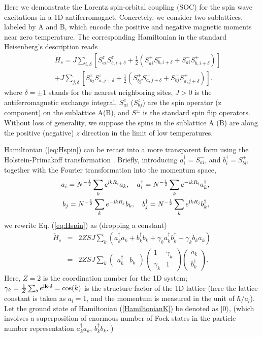\documentclass[pra,epsfig,rotate,superscriptaddress,showpacs]{revtex4}
\begin{document}
Here we demonstrate the Lorentz spin-orbital coupling (SOC) for the spin wave excitations in a 1D antiferromagnet. Concretely, we consider two sublattices, labeled by A and B, which encode the positive and negative magnetic moments near zero temperature. The corresponding Hamiltonian in the standard Heisenberg's description reads
\begin{eqnarray} \nonumber
&&H_s =J\sum_{i,\delta}[S_{ai}^zS_{b,i+\delta}^z+\frac{1}{2}(S_{ai}^+S_{b,i+\delta}^-+S_{ai}^-S_{b,i+\delta}^+)] \\
&&+J\sum_{j,\delta}[S_{bj}^zS_{a,j+\delta}^z+\frac{1}{2}(S_{bj}^+S_{a,j+\delta}^-+S_{bj}^-S_{a,j+\delta}^+)].\label{eq:Hspin}
\end{eqnarray}
where $\delta=\pm 1$ stands for the nearest neighboring sites, $J>0$ is the antiferromagnetic exchange integral, $S^z_{ai}$ ($S^z_{bj}$) are the spin operator (z component) on the sublattice A(B), and $S^\pm$ is the standard spin flip operators. Without loss of generality, we suppose the spins in the sublattice A (B) are along the positive (negative) $z$ direction in the limit of low temperatures.

Hamiltonian (\ref{eq:Hspin}) can be recast into a more transparent form using the Holstein-Primakoff transformation \cite{Holstein}. Briefly, introducing $a_i^\dag=S_{ai}^-$, and $b_i^\dag=S_{bi}^+$, together with the Fourier transformation into the momentum space,
\begin{eqnarray}
&&a_i=N^{-\frac{1}{2}}\sum_k e^{{\text i}kR_i}a_k, \quad a_i^\dag=N^{-\frac{1}{2}}\sum_k e^{-{\text i}kR_i}a_k^\dag, \\
&&b_j=N^{-\frac{1}{2}}\sum_k e^{-{\text i}kR_j}b_k, \quad b_j^\dag=N^{-\frac{1}{2}}\sum_k e^{{\text i}kR_j}b_k^\dag,
\end{eqnarray}
we rewrite Eq. (\ref{eq:Hspin}) as (dropping a constant)
\begin{eqnarray}  \label{HamiltonianK}
\tilde{H}_s&=&2ZSJ\sum_k(a_k^\dag a_k+b_k^\dag b_k+\gamma_k a_k^\dag b_k^\dag+\gamma_k b_k a_k) \nonumber\\
&=& 2ZSJ\sum_k \left(\begin{array}{cc}a_k^\dag&b_{k}\end{array} \right) \left(\begin{array}{cc}1&\gamma_k\\  \gamma_k&1\end{array} \right) \left(\begin{array}{c}a_k\\b_{k}^\dag\end{array} \right).
\end{eqnarray}
Here, $Z=2$ is the coordination number for the 1D system; $\gamma_k=\frac{1}{Z}\sum_\delta e^{{\text i}\mathbf{k}\cdot\mathbf{\delta}}=\cos(k)$ is the structure factor of the 1D lattice (here the lattice constant is taken as $a_l=1$, and the momentum is measured in the unit of $\hbar/a_l$). Let the ground state of Hamiltonian (\ref{HamiltonianK}) be denoted as $|0\rangle$, (which involves a superposition of enormous number of Fock states in the particle number representation $a_k^\dag a_k$, $b_k^\dag b_k$. )
\end{document}
